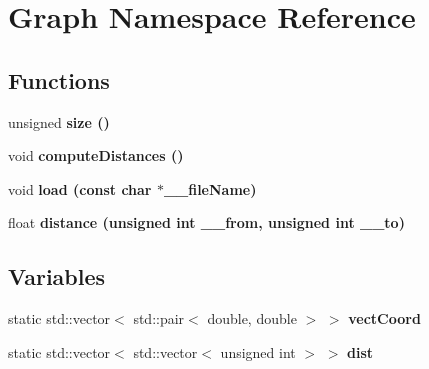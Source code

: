 \section{Graph Namespace Reference}
\label{namespace_graph}


\subsection*{Functions}
\begin{CompactItemize}
\item 
unsigned \bf{size} ()\label{namespace_graph_28d00fd97d57e79738e7df7ba8214f5c}

\item 
void \bf{compute\-Distances} ()\label{namespace_graph_517d15215e1529a6585e15949f29c326}

\item 
void \bf{load} (const char $\ast$\_\-\_\-file\-Name)\label{namespace_graph_95f0bc08fa93f8f4abf1801674488b30}

\item 
float \bf{distance} (unsigned int \_\-\_\-from, unsigned int \_\-\_\-to)\label{namespace_graph_510a8b9e849ec2c3241a09cac9d45cc6}

\end{CompactItemize}
\subsection*{Variables}
\begin{CompactItemize}
\item 
static std::vector$<$ std::pair$<$ double, double $>$ $>$ \bf{vect\-Coord}\label{namespace_graph_4199f2387f0cda6c75804c94b635e24c}

\item 
static std::vector$<$ std::vector$<$ unsigned int $>$ $>$ \bf{dist}\label{namespace_graph_c1316f71ab101e1f63eecd81a8d7a400}

\end{CompactItemize}
